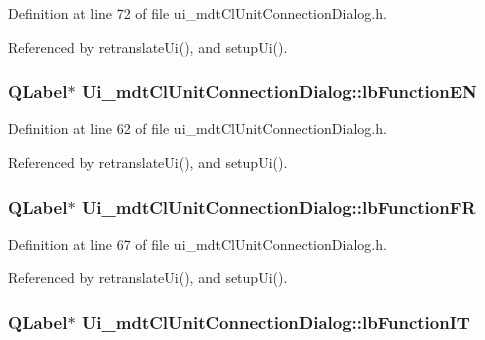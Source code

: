 Definition at line 72 of file ui\-\_\-mdt\-Cl\-Unit\-Connection\-Dialog.\-h.



Referenced by retranslate\-Ui(), and setup\-Ui().

\hypertarget{class_ui__mdt_cl_unit_connection_dialog_a936d55c8db696996c5c4f24e76848907}{
\subsubsection[{lb\-Function\-E\-N}]{\setlength{\rightskip}{0pt plus 5cm}Q\-Label$\ast$ Ui\-\_\-mdt\-Cl\-Unit\-Connection\-Dialog\-::lb\-Function\-E\-N}}\label{class_ui__mdt_cl_unit_connection_dialog_a936d55c8db696996c5c4f24e76848907}


Definition at line 62 of file ui\-\_\-mdt\-Cl\-Unit\-Connection\-Dialog.\-h.



Referenced by retranslate\-Ui(), and setup\-Ui().

\hypertarget{class_ui__mdt_cl_unit_connection_dialog_a3800d11e24e47e5462c9fa6e5e2f7972}{
\subsubsection[{lb\-Function\-F\-R}]{\setlength{\rightskip}{0pt plus 5cm}Q\-Label$\ast$ Ui\-\_\-mdt\-Cl\-Unit\-Connection\-Dialog\-::lb\-Function\-F\-R}}\label{class_ui__mdt_cl_unit_connection_dialog_a3800d11e24e47e5462c9fa6e5e2f7972}


Definition at line 67 of file ui\-\_\-mdt\-Cl\-Unit\-Connection\-Dialog.\-h.



Referenced by retranslate\-Ui(), and setup\-Ui().

\hypertarget{class_ui__mdt_cl_unit_connection_dialog_a13db5b8fb37f6ac2e83451b4119eb988}{
\subsubsection[{lb\-Function\-I\-T}]{\setlength{\rightskip}{0pt plus 5cm}Q\-Label$\ast$ Ui\-\_\-mdt\-Cl\-Unit\-Connection\-Dialog\-::lb\-Function\-I\-T}}\label{class_ui__mdt_cl_unit_connection_dialog_a13db5b8fb37f6ac2e83451b4119eb988}


